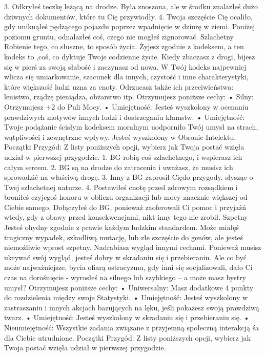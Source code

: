 3. Odkryłeś teczkę leżącą na drodze. Była znoszona, ale w  środku znalazłeś dużo dziwnych dokumentów, które tu Cię przywiodły.
4. Twoja szczęście Cię ocaliło, gdy uniknąłeś pędzącego pojazdu poprzez wpadnięcie w dziurę w ziemi. Poniżej poziomu gruntu, odnalazłeś coś, czego nie mogłeś zignorować. 
Szlachetny
Robienie tego, co słuszne, to sposób życia. Żyjesz zgodnie z kodeksem, a ten kodeks to ,coś, co dyktuje Twoje codzienne życie. Kiedy zbaczasz z drogi, bijesz się w pierś za swoją słabość i zaczynasz od nowa. W Twój kodeks najpewniej wlicza się umiarkowanie, szacunek dla innych, czystość i inne charakterystyki, które większość ludzi uzna za cnoty. Odrzucasz także ich przeciwieństwa: lenistwo, rządzę pieniądza, obżarstwo itp.
Otrzymujesz poniższe cechy:
    • Silny: Otrzymujesz +2 do Puli Mocy.
    • Umiejętność: Jesteś wyszkolony w ocenaniu prawdziwych motywów innych ludzi i dostrzeganiu kłamstw.
    • Umiejętność: Twoje podążanie ścisłym kodeksem moralnym uodporniło Twój umysł na strach, wątpliwości i zewnętrzne wpływy. Jesteś wyszkolony w Obronie Intelektu.
Początki Przygód: Z listy poniższych opcji, wybierz jak Twoja postać wzięła udział w pierwszej przygodzie.
1. BG robią coś szlachetnego, i wspierasz ich całym sercem.
2. BG są na drodze do zatracenia i uważasz, że musisz ich sprowadzić na właściwą drogę.
3. Inny z BG zaprosił Ciędo przygody, słysząc o Twej szlachetnej naturze.
4. Postawiłeś cnotę przed zdrowym rozsądkiem i broniłeś czyjegoś honoru w obliczu organizacji lub mocy znacznie większej od Ciebie samego. Dołączyłeś do BG, ponieważ zaoferowali Ci pomoc i przyjaźń wtedy, gdy z obawy przed konsekwencjami, nikt inny tego nie zrobił.
Szpetny
Jesteś ohydny zgodnie z prawie każdym ludzkim standardem. Może miałęś tragiczny wypadek, szkodliwą mutację, lub złe szczęście do genów, ale jesteś niemożliwie wprost szpetny.
Nadrabiasz wygląd innymi cechami. Ponieważ musisz ukrywać swój wygląd, jesteś dobry w skradaniu się i przebieraniu. Ale co być może najważniejsze, bycia ofiarą ostracyzmu, gdy inni się socjalizowali, dało Ci czas na dorośnięcie  - wyrosłeś na silnego lub szybkiego – a może masz bystry umysł? 
Otrzymujesz poniższe cechy:
    • Uniwersalny: Masz dodatkowe 4 punkty do rozdzielenia między swoje Statystyki.
    • Umiejętność: Jesteś wyszkolony w zastraszaniu i innych akcjach bazujących na lęku, jeśli pokażesz swoją prawdziwą twarz.
    • Umiejętność: Jesteś wyszkolony w skradaniu się i przebieraniu się.
    • Nieumiejętność: Wszystkie zadania związane z przyjemną społeczną interakcją śa dla Ciebie utrudnione.
Początki Przygód: Z listy poniższych opcji, wybierz jak Twoja postać wzięła udział w pierwszej przygodzie.
